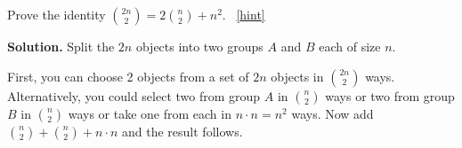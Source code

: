 \documentclass{book}
\begin{document}
\setcounter{project}{94}
\addtocounter{project}{-1}
\begin{activity}[]\label{act-redgreenballs}
\hypertarget{p-716}{}%
Prove the identity \(\binom{2n}{2} = 2 \binom{n}{2} + n^{2}\).%
~\hfill{\tiny\hyperlink{a-94}{[hint]}\hypertarget{q-94}{}}\par\smallskip%
\noindent\textbf{Solution.}\hypertarget{solution-68}{}\quad%
\hypertarget{p-718}{}%
Split the \(2n\) objects into two groups \(A\) and \(B\) each of size \(n\).%
\par
\hypertarget{p-719}{}%
First, you can choose 2 objects from a set of \(2n\) objects in \(\binom{2n}{2}\) ways. Alternatively, you could select two from group \(A\) in \(\binom{n}{2}\) ways or two from group \(B\) in \(\binom{n}{2}\) ways or take one from each in \(n \cdot n = n^{2}\) ways. Now add \(\binom{n}{2} + \binom{n}{2}+ n \cdot n\) and the result follows.%
\end{activity}
\end{document}
